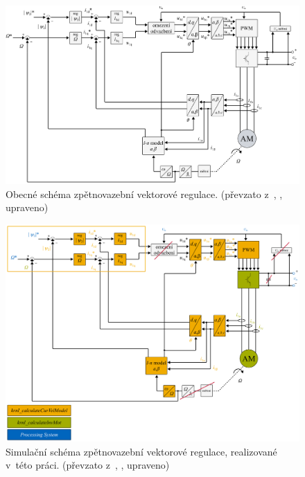 \documentclass[a4paper, twoside, 11pt]{article}
\begin{document}
	\begin{figure}[htbp!]
		\centering
			\includegraphics[width=1\textwidth]{src/pdf/foc-block.pdf} 
			\caption{Obecné schéma zpětnovazební vektorové regulace. (převzato z~\cite{lipcak-bauer-ept-moodle}, \cite{kobrle-elektricke-pohony}, upraveno)}
			\label{fig:foc-block}
	\end{figure}

	\begin{figure}[htbp!]
		\centering
			\includegraphics[width=1\textwidth]{src/pdf/foc-block-colored.pdf} 
			\caption{Simulační schéma zpětnovazební vektorové regulace, realizované v~této práci. (převzato z~\cite{lipcak-bauer-ept-moodle}, \cite{kobrle-elektricke-pohony}, upraveno)}
			\label{foc-block-colored}
	\end{figure}
\end{document}
